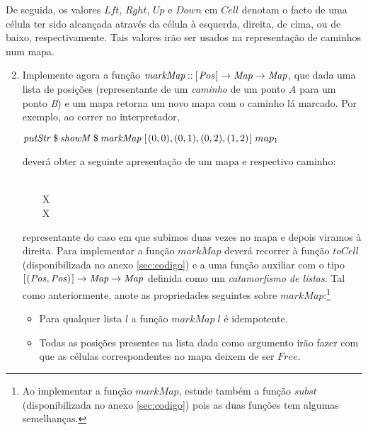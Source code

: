 \documentclass[a4paper]{article}
\newcommand{\Conid}[1]{\mathit{#1}}
\newcommand{\Varid}[1]{\mathit{#1}}
\begin{document}
De seguida, os valores \ensuremath{\Conid{Lft}}, \ensuremath{\Conid{Rght}},
\ensuremath{\Conid{Up}} e \ensuremath{\Conid{Down}} em \ensuremath{\Conid{Cell}} denotam o facto de uma célula ter sido alcançada
através da célula à esquerda, direita, de cima, ou de baixo, respectivamente.
Tais valores irão ser usados na representação de caminhos num mapa.

\begin{enumerate}
\setcounter{enumi}{1}
\item

Implemente agora a função \ensuremath{\Varid{markMap}\mathbin{::}[\mskip1.5mu \Conid{Pos}\mskip1.5mu]\to \Conid{Map}\to \Conid{Map}},
que dada uma lista de posições (representante de um \emph{caminho} de um ponto \emph{A} para
um ponto \emph{B}) e um mapa retorna um novo mapa com o caminho lá marcado.
Por exemplo, ao correr no interpretador,
\begin{center}
\ensuremath{\Varid{putStr}\mathbin{\$}\Varid{showM}\mathbin{\$}\Varid{markMap}\;[\mskip1.5mu (\mathrm{0},\mathrm{0}),(\mathrm{0},\mathrm{1}),(\mathrm{0},\mathrm{2}),(\mathrm{1},\mathrm{2})\mskip1.5mu]\;map_1 }
\end{center}
deverá obter a seguinte apresentação de um mapa e respectivo caminho:
\begin{tabbing}\ttfamily
~~~~~~\\
\ttfamily ~~~~X~~\\
\ttfamily ~~~~X~~
\end{tabbing}
representante do caso em que subimos duas vezes no mapa e depois viramos à direita.
Para implementar a função \ensuremath{\Varid{markMap}} deverá recorrer à função \ensuremath{\Varid{toCell}} (disponibilizada
no anexo \ref{sec:codigo}) e a uma função auxiliar com o tipo \ensuremath{[\mskip1.5mu (\Conid{Pos},\Conid{Pos})\mskip1.5mu]\to \Conid{Map}\to \Conid{Map}} definida como
um \emph{catamorfismo de listas}. Tal como anteriormente, anote as propriedades seguintes sobre
\ensuremath{\Varid{markMap}}:\footnote{Ao implementar a função \ensuremath{\Varid{markMap}}, estude também
a função \ensuremath{\Varid{subst}} (disponibilizada no anexo \ref{sec:codigo}) pois as duas funções tem
algumas semelhanças.}
\begin{itemize}\em
\item      Para qualquer lista \ensuremath{\Varid{l}} a função \ensuremath{\Varid{markMap}\;\Varid{l}} é idempotente.
\item      Todas as posições presentes na lista dada como argumento
irão fazer com que as células correspondentes no mapa deixem de ser \ensuremath{\Conid{Free}}.
\end{itemize}
\end{enumerate}
\end{document}
